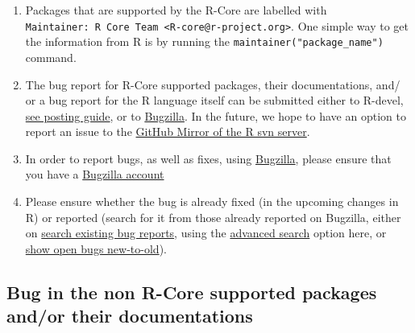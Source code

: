 \documentclass[
]{book}
\begin{document}
\begin{enumerate}
\def\labelenumi{\arabic{enumi}.}
\item
  Packages that are supported by the R-Core are labelled with \texttt{Maintainer:\ R\ Core\ Team\ \textless{}R-core@r-project.org\textgreater{}}. One simple way to get the information from R is by running the \texttt{maintainer("package\_name")} command.
\item
  The bug report for R-Core supported packages, their documentations, and/ or a bug report for the R language itself can be submitted either to R-devel, \href{https://www.r-project.org/posting-guide.html\#which_list}{see posting guide}, or to \href{https://bugs.r-project.org/bugzilla/}{Bugzilla}. In the future, we hope to have an option to report an issue to the \href{https://github.com/r-devel/r-svn/issues}{GitHub Mirror of the R svn server}.
\item
  In order to report bugs, as well as fixes, using \hyperref[Bugzilla]{Bugzilla}, please ensure that you have a \hyperref[bugzilla-account]{Bugzilla account}
\item
  Please ensure whether the bug is already fixed (in the upcoming changes in R) or reported (search for it from those already reported on Bugzilla, either on \href{https://bugs.r-project.org/bugzilla/query.cgi}{search existing bug reports}, using the \href{https://bugs.r-project.org/bugzilla/query.cgi?format=advanced}{advanced search} option here, or \href{https://bugs.r-project.org/bugzilla/buglist.cgi?bug_file_loc_type=allwordssubstr&bug_status=NEW&bug_status=ASSIGNED&bug_status=CONFIRMED&bug_status=REOPENED&bug_status=UNCONFIRMED&bugidtype=include&chfieldto=Now&cmdtype=doit&emailassigned_to1=1&emailassigned_to2=1&emailcc2=1&emailreporter2=1&emailtype1=substring&emailtype2=substring&field0-0-0=noop&long_desc_type=substring&order=bugs.delta_ts\%20desc&query_format=advanced&short_desc_type=allwordssubstr&type0-0-0=noop}{show open bugs new-to-old}).
\end{enumerate}

\subsection{Bug in the non R-Core supported packages and/or their documentations}\label{nonRCorePkgBug}
\end{document}
